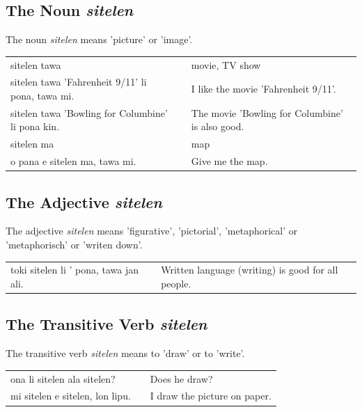 %
\subsection*{The Noun \textit{sitelen}}
%
%
The noun \textit{sitelen} means 'picture' or 'image'. 

\begin{supertabular}{p{5,5cm}|ll}
sitelen tawa  && movie, TV show \\
sitelen tawa 'Fahrenheit 9/11' li pona, tawa mi. && I like the movie 'Fahrenheit 9/11'. \\
sitelen tawa 'Bowling for Columbine' li pona kin. && The movie 'Bowling for Columbine' is also good. \\
sitelen ma && map \\
o pana e sitelen ma, tawa mi. && Give me the map. \\
\end{supertabular} 

%
\subsection*{The Adjective \textit{sitelen}}
%
%
The adjective \textit{sitelen} means 'figurative', 'pictorial', 'metaphorical' or 'metaphorisch' or 'writen down'.

\begin{supertabular}{p{5,5cm}|ll}
toki sitelen li ' pona, tawa jan ali. && Written language (writing) is good for all people. \\
\end{supertabular}

%
\subsection*{The Transitive Verb \textit{sitelen}}
%
%
The transitive verb \textit{sitelen} means to 'draw' or to 'write'. 

\begin{supertabular}{p{5,5cm}|ll}
ona li sitelen ala sitelen? && Does he draw? \\
mi sitelen e sitelen, lon lipu. && I draw the picture on paper. \\
\end{supertabular}

